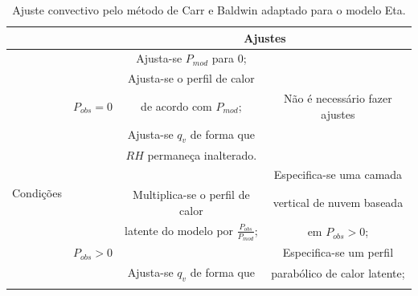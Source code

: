 \begin{table}
\caption{Ajuste convectivo pelo método de Carr e Baldwin adaptado para o \-mo\-de\-lo Eta.}
\label{tab03}
\centering
\begin{tabular}{|c|c|c|c|}
\cline{3-4} 
\multicolumn{1}{c}{} &  & \multicolumn{2}{c|}{Ajustes}\tabularnewline
\hline 
\begin{sideways}

\end{sideways} &  & Ajusta-se $P_{mod}$ para 0; & \tabularnewline
\begin{sideways}

\end{sideways} &  & Ajusta-se o perfil de calor & \tabularnewline
\begin{sideways}

\end{sideways} & $P_{obs}=0$ & de acordo com $P_{mod}$; & Não é necessário fazer ajustes\tabularnewline
\begin{sideways}

\end{sideways} &  & Ajusta-se $q_{v}$ de forma que & \tabularnewline
\begin{sideways}

\end{sideways} &  & $RH$ permaneça inalterado. & \tabularnewline
\cline{2-4} 
\multirow{2}{0pt}{\begin{sideways}Condições\end{sideways}}
\begin{sideways}

\end{sideways} &  &  & Especifica-se uma camada\tabularnewline
 
\begin{sideways}

\end{sideways} &  & Multiplica-se o perfil de calor & vertical de nuvem baseada\tabularnewline
\begin{sideways}

\end{sideways} &  & latente do modelo por $\frac{P_{obs}}{P_{mod}}$; & em $P_{obs}>0$;\tabularnewline
\begin{sideways}

\end{sideways} & $P_{obs}>0$&  & Especifica-se um perfil\tabularnewline
\begin{sideways}

\end{sideways} &  & Ajusta-se $q_{v}$ de forma que & parabólico de calor latente;\tabularnewline
\begin{sideways}


\end{sideways}
\end{tabular}
\end{table}
